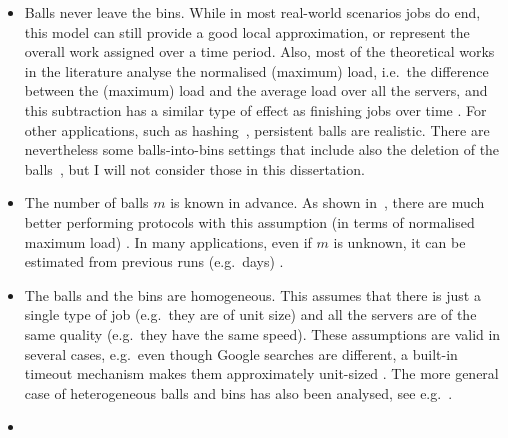 \begin{itemize}
    \item
    Balls never leave the bins. While in most real-world scenarios jobs do end, this model can still provide a good local approximation, or represent the overall work assigned over a time period. Also, most of the theoretical works in the literature analyse the normalised (maximum) load, i.e.\ the difference between the (maximum) load and the average load over all the servers, and this subtraction has a similar type of effect as finishing jobs over time . For other applications, such as hashing~\cite{udi2017ballsintobinslandscape}, persistent balls are realistic. There are nevertheless some balls-into-bins settings that include also the deletion of the balls~\cite{azar1999twochoice}, but I will not consider those in this dissertation.
    \item
    The number of balls $m$ is known in advance. As shown in~\cite{feldheim2021longtermthinning}, there are much better performing protocols with this assumption (in terms of normalised maximum load) . In many applications, even if $m$ is unknown, it can be estimated from previous runs (e.g.\ days) .
    \item
    The balls and the bins are homogeneous. This assumes that there is just a single type of job (e.g.\ they are of unit size) and all the servers are of the same quality (e.g.\ they have the same speed). These assumptions are valid in several cases, e.g.\ even though Google searches are different, a built-in timeout mechanism makes them approximately unit-sized . The more general case of heterogeneous balls and bins has also been analysed, see e.g.~\cite{berenbrink2008weighted}.
    \item

\end{itemize}
